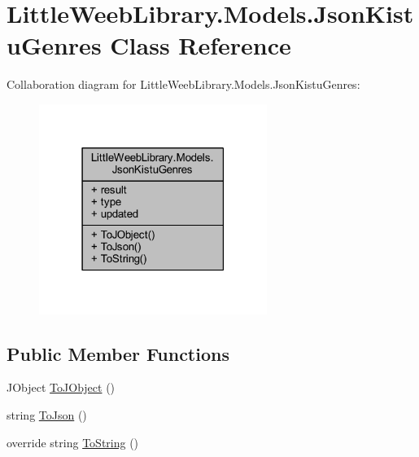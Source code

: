 \hypertarget{class_little_weeb_library_1_1_models_1_1_json_kistu_genres}{}\section{Little\+Weeb\+Library.\+Models.\+Json\+Kistu\+Genres Class Reference}
\label{class_little_weeb_library_1_1_models_1_1_json_kistu_genres}


Collaboration diagram for Little\+Weeb\+Library.\+Models.\+Json\+Kistu\+Genres\+:\nopagebreak
\begin{figure}[H]
\begin{center}
\leavevmode
\includegraphics[width=210pt]{class_little_weeb_library_1_1_models_1_1_json_kistu_genres__coll__graph}
\end{center}
\end{figure}
\subsection*{Public Member Functions}
\begin{DoxyCompactItemize}
\item 
J\+Object \mbox{\hyperlink{class_little_weeb_library_1_1_models_1_1_json_kistu_genres_a0cce3f3f712276fbae17ef4d99ec6fad}{To\+J\+Object}} ()
\item 
string \mbox{\hyperlink{class_little_weeb_library_1_1_models_1_1_json_kistu_genres_aad51f41f73ee3bb3f21196e721af3658}{To\+Json}} ()
\item 
override string \mbox{\hyperlink{class_little_weeb_library_1_1_models_1_1_json_kistu_genres_aff942cf4016346e9df66de3b8c2b7cf6}{To\+String}} ()
\end{DoxyCompactItemize}
